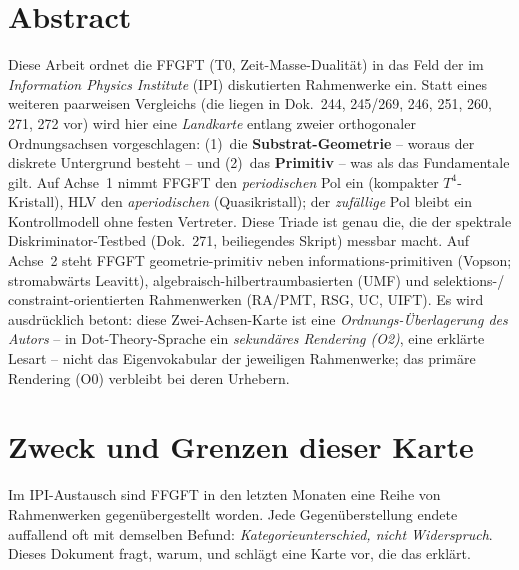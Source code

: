 
\section*{Abstract}
Diese Arbeit ordnet die FFGFT (T0, Zeit-Masse-Dualität) in das Feld der im
\emph{Information Physics Institute} (IPI) diskutierten Rahmenwerke ein. Statt eines
weiteren paarweisen Vergleichs (die liegen in Dok.~244, 245/269, 246, 251, 260, 271, 272 vor)
wird hier eine \emph{Landkarte} entlang zweier orthogonaler Ordnungsachsen vorgeschlagen:
(1)~die \textbf{Substrat-Geometrie} -- woraus der diskrete Untergrund besteht -- und
(2)~das \textbf{Primitiv} -- was als das Fundamentale gilt. Auf Achse~1 nimmt FFGFT den
\emph{periodischen} Pol ein (kompakter $T^4$-Kristall), HLV den \emph{aperiodischen}
(Quasikristall); der \emph{zufällige} Pol bleibt ein Kontrollmodell ohne festen Vertreter.
Diese Triade ist genau die, die der spektrale Diskriminator-Testbed (Dok.~271, beiliegendes
Skript) messbar macht. Auf Achse~2 steht FFGFT geometrie-primitiv neben informations-primitiven
(Vopson; stromabwärts Leavitt), algebraisch-hilbertraumbasierten (UMF) und selektions-/
constraint-orientierten Rahmenwerken (RA/PMT, RSG, UC, UIFT). Es wird ausdrücklich betont:
diese Zwei-Achsen-Karte ist eine \emph{Ordnungs-Überlagerung des Autors} -- in Dot-Theory-Sprache
ein \emph{sekundäres Rendering (O2)}, eine erklärte Lesart -- nicht das Eigenvokabular der
jeweiligen Rahmenwerke; das primäre Rendering (O0) verbleibt bei deren Urhebern.

\section{Zweck und Grenzen dieser Karte}

Im IPI-Austausch sind FFGFT in den letzten Monaten eine Reihe von Rahmenwerken
gegenübergestellt worden. Jede Gegenüberstellung endete auffallend oft mit demselben
Befund: \emph{Kategorieunterschied, nicht Widerspruch}. Dieses Dokument fragt, warum,
und schlägt eine Karte vor, die das erklärt.

